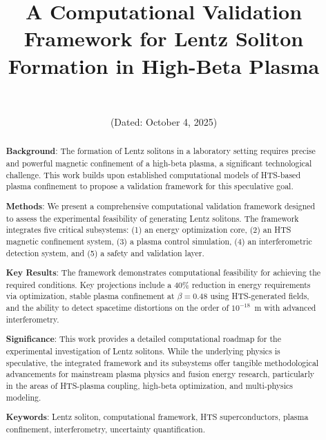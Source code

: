 \documentclass[12pt,a4paper]{article}
\begin{document}
\title{A Computational Validation Framework for Lentz Soliton Formation in High-Beta Plasma}

\author{\authorname\\\texttt{\authoremail}}
\date{(Dated: October 4, 2025)}

\maketitle

\begin{abstract}
\textbf{Background}: The formation of Lentz solitons in a laboratory setting requires precise and powerful magnetic confinement of a high-beta plasma, a significant technological challenge. This work builds upon established computational models of HTS-based plasma confinement to propose a validation framework for this speculative goal.

\textbf{Methods}: We present a comprehensive computational validation framework designed to assess the experimental feasibility of generating Lentz solitons. The framework integrates five critical subsystems: (1) an energy optimization core, (2) an HTS magnetic confinement system, (3) a plasma control simulation, (4) an interferometric detection system, and (5) a safety and validation layer.

\textbf{Key Results}: The framework demonstrates computational feasibility for achieving the required conditions. Key projections include a 40\% reduction in energy requirements via optimization, stable plasma confinement at $\beta=0.48$ using HTS-generated fields, and the ability to detect spacetime distortions on the order of $10^{-18}$~m with advanced interferometry.

\textbf{Significance}: This work provides a detailed computational roadmap for the experimental investigation of Lentz solitons. While the underlying physics is speculative, the integrated framework and its subsystems offer tangible methodological advancements for mainstream plasma physics and fusion energy research, particularly in the areas of HTS-plasma coupling, high-beta optimization, and multi-physics modeling.

\textbf{Keywords}: Lentz soliton, computational framework, HTS superconductors, plasma confinement, interferometry, uncertainty quantification.
\end{abstract}
\end{document}
